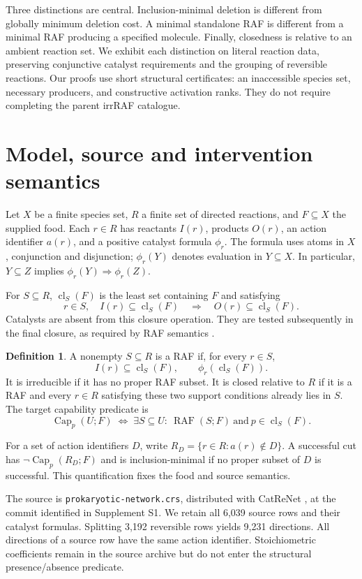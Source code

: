 \documentclass[11pt]{article}
\theoremstyle{definition}\newtheorem{definition}[theorem]{Definition}
\newcommand{\cl}{\operatorname{cl}}
\newcommand{\RAF}{\operatorname{RAF}}
\renewcommand{\Cap}{\operatorname{Cap}}
\newcommand{\rxn}[1]{\texttt{#1}}
\begin{document}
Three distinctions are central. Inclusion-minimal deletion is different from globally minimum deletion cost. A minimal standalone RAF is different from a minimal RAF producing a specified molecule. Finally, closedness is relative to an ambient reaction set. We exhibit each distinction on literal reaction data, preserving conjunctive catalyst requirements and the grouping of reversible reactions. Our proofs use short structural certificates: an inaccessible species set, necessary producers, and constructive activation ranks. They do not require completing the parent irrRAF catalogue.

\section{Model, source and intervention semantics}
Let $X$ be a finite species set, $R$ a finite set of directed reactions, and $F\subseteq X$ the supplied food. Each $r\in R$ has reactants $I(r)$, products $O(r)$, an action identifier $a(r)$, and a positive catalyst formula $\phi_r$. The formula uses atoms in $X$, conjunction and disjunction; $\phi_r(Y)$ denotes evaluation in $Y\subseteq X$. In particular, $Y\subseteq Z$ implies $\phi_r(Y)\Rightarrow\phi_r(Z)$.

For $S\subseteq R$, $\cl_S(F)$ is the least set containing $F$ and satisfying
\[
 r\in S,\quad I(r)\subseteq\cl_S(F)
 \quad\Longrightarrow\quad O(r)\subseteq\cl_S(F).
\]
Catalysts are absent from this closure operation. They are tested subsequently in the final closure, as required by RAF semantics \cite{hordijk2023}.

\begin{definition}
A nonempty $S\subseteq R$ is a RAF if, for every $r\in S$,
\[
 I(r)\subseteq\cl_S(F),\qquad \phi_r(\cl_S(F)).
\]
It is irreducible if it has no proper RAF subset. It is closed relative to $R$ if it is a RAF and every $r\in R$ satisfying these two support conditions already lies in $S$. The target capability predicate is
\[
 \Cap_p(U;F)\;\Longleftrightarrow\;
 \exists S\subseteq U:\ \RAF(S;F)\ \text{and}\ p\in\cl_S(F).
\]
\end{definition}

For a set of action identifiers $D$, write $R_D=\{r\in R:a(r)\notin D\}$. A successful cut has $\neg\Cap_p(R_D;F)$ and is inclusion-minimal if no proper subset of $D$ is successful. This quantification fixes the food and source semantics.

The source is \rxn{prokaryotic-network.crs}, distributed with CatReNet \cite{catrenet,source}, at the commit identified in Supplement S1. We retain all 6,039 source rows and their catalyst formulas. Splitting 3,192 reversible rows yields 9,231 directions. All directions of a source row have the same action identifier. Stoichiometric coefficients remain in the source archive but do not enter the structural presence/absence predicate.
\end{document}

